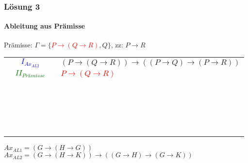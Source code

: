 \begin{frame}
	\frametitle{Lösung 3}
	\framesubtitle{Ableitung aus Prämisse}
	Prämisse: $\Gamma =\{$\textcolor{red}{$P\rightarrow(Q\rightarrow R)$}$, Q\}$, zz: $P\rightarrow R$\\
	\begin{tabular}{cl}
		\textcolor{blue}{$I_{Ax_{AL2}}$}       & $(P\rightarrow(Q\rightarrow R))\rightarrow((P\rightarrow Q)\rightarrow(P\rightarrow R))$ \\
		\textcolor{green}{$II_{Prämisse}$}     & \textcolor{red}{$P\rightarrow(Q\rightarrow R)$}                                          \\
		\textcolor{white}{$III_{MP(I, II)}$}   & \textcolor{white}{$(P\rightarrow Q)\rightarrow(P\rightarrow R)$}                         \\
		\textcolor{white}{$IV_{Prämisse}$}     & \textcolor{white}{$Q$}                                                                   \\
		\textcolor{white}{$V_{IV, Ax_{AL1}}$}  & \textcolor{white}{$Q\rightarrow(P\rightarrow Q)$}                                        \\
		\textcolor{white}{$VI_{MP(IV, V)}$}    & \textcolor{white}{$P\rightarrow Q$}                                                      \\
		\textcolor{white}{$VII_{MP(III, VI)}$} & \textcolor{white}{$P\rightarrow R$}                                                      \\
	\end{tabular}
	$Ax_{AL1} = (G\rightarrow(H\rightarrow G))$\\
	$Ax_{AL2} = (G\rightarrow(H\rightarrow K))\rightarrow((G\rightarrow H)\rightarrow(G\rightarrow K))$\\
\end{frame}
